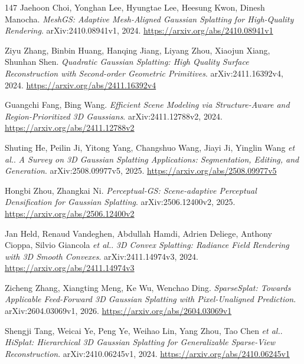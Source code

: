 \documentclass[11pt,a4paper]{article}
\begin{document}
\begin{thebibliography}{147}
Jaehoon Choi, Yonghan Lee, Hyungtae Lee, Heesung Kwon, Dinesh Manocha.
\newblock \emph{MeshGS: Adaptive Mesh-Aligned Gaussian Splatting for High-Quality Rendering}.
\newblock arXiv:2410.08941v1, 2024.
\newblock \url{https://arxiv.org/abs/2410.08941v1}

Ziyu Zhang, Binbin Huang, Hanqing Jiang, Liyang Zhou, Xiaojun Xiang, Shunhan Shen.
\newblock \emph{Quadratic Gaussian Splatting: High Quality Surface Reconstruction with Second-order Geometric Primitives}.
\newblock arXiv:2411.16392v4, 2024.
\newblock \url{https://arxiv.org/abs/2411.16392v4}

Guangchi Fang, Bing Wang.
\newblock \emph{Efficient Scene Modeling via Structure-Aware and Region-Prioritized 3D Gaussians}.
\newblock arXiv:2411.12788v2, 2024.
\newblock \url{https://arxiv.org/abs/2411.12788v2}

Shuting He, Peilin Ji, Yitong Yang, Changshuo Wang, Jiayi Ji, Yinglin Wang \emph{et al.}.
\newblock \emph{A Survey on 3D Gaussian Splatting Applications: Segmentation, Editing, and Generation}.
\newblock arXiv:2508.09977v5, 2025.
\newblock \url{https://arxiv.org/abs/2508.09977v5}

Hongbi Zhou, Zhangkai Ni.
\newblock \emph{Perceptual-GS: Scene-adaptive Perceptual Densification for Gaussian Splatting}.
\newblock arXiv:2506.12400v2, 2025.
\newblock \url{https://arxiv.org/abs/2506.12400v2}

Jan Held, Renaud Vandeghen, Abdullah Hamdi, Adrien Deliege, Anthony Cioppa, Silvio Giancola \emph{et al.}.
\newblock \emph{3D Convex Splatting: Radiance Field Rendering with 3D Smooth Convexes}.
\newblock arXiv:2411.14974v3, 2024.
\newblock \url{https://arxiv.org/abs/2411.14974v3}

Zicheng Zhang, Xiangting Meng, Ke Wu, Wenchao Ding.
\newblock \emph{SparseSplat: Towards Applicable Feed-Forward 3D Gaussian Splatting with Pixel-Unaligned Prediction}.
\newblock arXiv:2604.03069v1, 2026.
\newblock \url{https://arxiv.org/abs/2604.03069v1}

Shengji Tang, Weicai Ye, Peng Ye, Weihao Lin, Yang Zhou, Tao Chen \emph{et al.}.
\newblock \emph{HiSplat: Hierarchical 3D Gaussian Splatting for Generalizable Sparse-View Reconstruction}.
\newblock arXiv:2410.06245v1, 2024.
\newblock \url{https://arxiv.org/abs/2410.06245v1}


\end{thebibliography}
\end{document}
